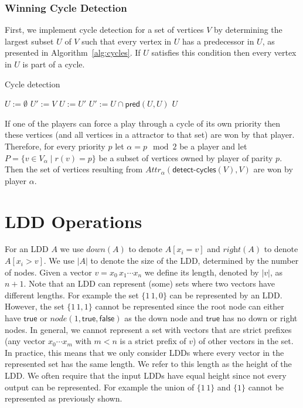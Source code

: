 \documentclass{article}
\newcommand{\var}[1]{\ensuremath{\textit{#1}}}
\newcommand{\attrsym}{\ensuremath{\textit{Attr}}}
\newcommand{\attr}[3][]{\ensuremath{\attrsym^{#1}_{#2}(#3)}}
\begin{document}
\subsubsection{Winning Cycle Detection}

First, we implement cycle detection for a set of vertices $V$ by determining the largest subset $U$ of $V$ such that every vertex in $U$ has a predecessor in $U$, as presented in Algorithm~\ref{alg:cycles}.
If $U$ satisfies this condition then every vertex in $U$ is part of a cycle.

\begin{algorithm}[h]
\caption{Cycle detection}
\label{alg:cycles}
\begin{algorithmic}[1]
\State $U := \emptyset$
\State $U' := V$
  \State $U := U'$
  \State $U' := U \cap \textsf{pred}(U, U)$
\EndWhile
\State \Return $U$
\EndFunction
\end{algorithmic}
\end{algorithm}

If one of the players can force a play through a cycle of its own priority then these vertices (and all vertices in a attractor to that set) are won by that player.
Therefore, for every priority $p$ let $\alpha = p \mod 2$ be a player and let $P = \{v \in V_\alpha \mid r(v) = p\}$ be a subset of vertices owned by player of parity $p$.
Then the set of vertices resulting from $\attr{\alpha}{\textsf{detect-cycles}(V), V}$ are won by player $\alpha$.

\newpage
\section{LDD Operations}

\newcommand{\lddnode}{\textsf{node}}
\newcommand{\lddright}{\textit{right}}
\newcommand{\ldddown}{\textit{down}}
\newcommand{\lddval}{\textit{val}}
\newcommand{\lddtrue}{\textsf{true}}
\newcommand{\lddfalse}{\textsf{false}}

For an LDD $A$ we use $\ldddown(A)$ to denote $A[x_i = v]$ and $\lddright(A)$ to denote $A[x_i > v]$.
We use $|A|$ to denote the size of the LDD, determined by the number of nodes.
Given a vector $v = x_0\,x_1 \cdots x_n$ we define its length, denoted by $|v|$, as $n + 1$.
Note that an LDD can represent (some) sets where two vectors have different lengths.
For example the set $\{1\,1, 0\}$ can be represented by an LDD.
However, the set $\{1\,1, 1\}$ cannot be represented since the root node can either have $\textsf{true}$ or $\var{node}(1, \textsf{true}, \textsf{false})$ as the down node and $\textsf{true}$ has no down or right nodes.
In general, we cannot represent a set with vectors that are strict prefixes (any vector $x_0 \cdots x_m$ with $m < n$ is a strict prefix of $v$) of other vectors in the set.
In practice, this means that we only consider LDDs where every vector in the represented set has the same length.
We refer to this length as the height of the LDD.
We often require that the input LDDs have equal height since not every output can be represented.
For example the union of $\{1\,1\}$ and $\{1\}$ cannot be represented as previously shown.
\end{document}
